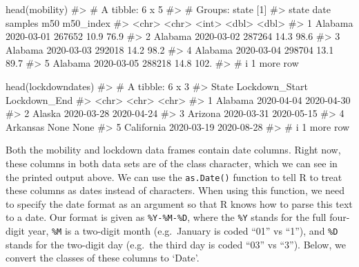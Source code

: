 \documentclass[
  letterpaper,
]{krantz}
\makeatletter
\newenvironment{Shaded}{\begin{snugshade}}{\end{snugshade}}
\newcommand{\CommentTok}[1]{\textcolor[rgb]{0.37,0.37,0.37}{#1}}
\newcommand{\FunctionTok}[1]{\textcolor[rgb]{0.28,0.35,0.67}{#1}}
\newcommand{\NormalTok}[1]{\textcolor[rgb]{0.00,0.23,0.31}{#1}}
\newenvironment{kframe}{%
\medskip{}
\setlength{\fboxsep}{.8em}
 \def\at@end@of@kframe{}%
 \ifinner\ifhmode%
  \def\at@end@of@kframe{\end{minipage}}%
  \begin{minipage}{\columnwidth}%
 \fi\fi%
 \def\FrameCommand##1{\hskip\@totalleftmargin \hskip-\fboxsep
 \colorbox{shadecolor}{##1}\hskip-\fboxsep
     \hskip-\linewidth \hskip-\@totalleftmargin \hskip\columnwidth}%
 \MakeFramed {\advance\hsize-\width
   \@totalleftmargin\z@ \linewidth\hsize
   \@setminipage}}%
 {\par\unskip\endMakeFramed%
 \at@end@of@kframe}
\renewenvironment{Shaded}{\begin{kframe}}{\end{kframe}}
\makeatother
\begin{document}
\begin{Shaded}
\begin{Highlighting}[]
\FunctionTok{head}\NormalTok{(mobility)}
\CommentTok{\#\textgreater{} \# A tibble: 6 x 5}
\CommentTok{\#\textgreater{} \# Groups:   state [1]}
\CommentTok{\#\textgreater{}   state   date       samples   m50 m50\_index}
\CommentTok{\#\textgreater{}   \textless{}chr\textgreater{}   \textless{}chr\textgreater{}        \textless{}int\textgreater{} \textless{}dbl\textgreater{}     \textless{}dbl\textgreater{}}
\CommentTok{\#\textgreater{} 1 Alabama 2020{-}03{-}01  267652  10.9      76.9}
\CommentTok{\#\textgreater{} 2 Alabama 2020{-}03{-}02  287264  14.3      98.6}
\CommentTok{\#\textgreater{} 3 Alabama 2020{-}03{-}03  292018  14.2      98.2}
\CommentTok{\#\textgreater{} 4 Alabama 2020{-}03{-}04  298704  13.1      89.7}
\CommentTok{\#\textgreater{} 5 Alabama 2020{-}03{-}05  288218  14.8     102. }
\CommentTok{\#\textgreater{} \# i 1 more row}
\end{Highlighting}
\end{Shaded}

\begin{Shaded}
\begin{Highlighting}[]
\FunctionTok{head}\NormalTok{(lockdowndates)}
\CommentTok{\#\textgreater{} \# A tibble: 6 x 3}
\CommentTok{\#\textgreater{}   State      Lockdown\_Start Lockdown\_End}
\CommentTok{\#\textgreater{}   \textless{}chr\textgreater{}      \textless{}chr\textgreater{}          \textless{}chr\textgreater{}       }
\CommentTok{\#\textgreater{} 1 Alabama    2020{-}04{-}04     2020{-}04{-}30  }
\CommentTok{\#\textgreater{} 2 Alaska     2020{-}03{-}28     2020{-}04{-}24  }
\CommentTok{\#\textgreater{} 3 Arizona    2020{-}03{-}31     2020{-}05{-}15  }
\CommentTok{\#\textgreater{} 4 Arkansas   None           None        }
\CommentTok{\#\textgreater{} 5 California 2020{-}03{-}19     2020{-}08{-}28  }
\CommentTok{\#\textgreater{} \# i 1 more row}
\end{Highlighting}
\end{Shaded}

Both the mobility and lockdown data frames contain date columns. Right
now, these columns in both data sets are of the class character, which
we can see in the printed output above. We can use the
\texttt{as.Date()} function to tell R to treat these columns as dates
instead of characters. When using this function, we need to specify the
date format as an argument so that R knows how to parse this text to a
date. Our format is given as \texttt{\%Y-\%M-\%D}, where the
\texttt{\%Y} stands for the full four-digit year, \texttt{\%M} is a
two-digit month (e.g.~January is coded ``01'' vs ``1''), and
\texttt{\%D} stands for the two-digit day (e.g.~the third day is coded
``03'' vs ``3''). Below, we convert the classes of these columns to
`Date'.
\end{document}
